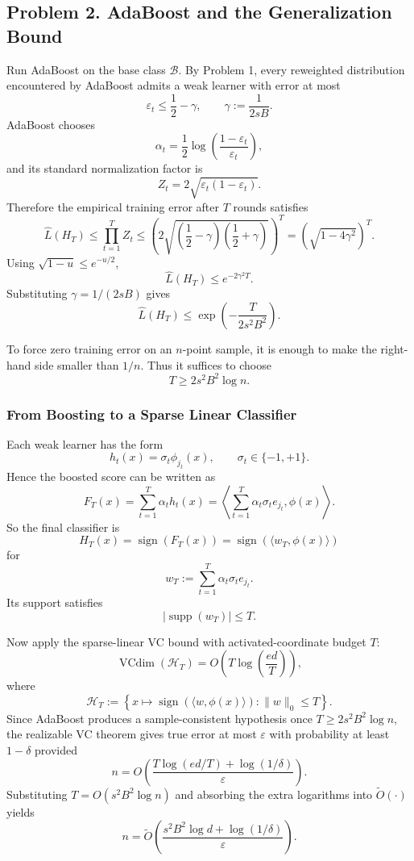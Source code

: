 \documentclass{article}
\DeclareMathOperator{\sign}{sign}
\DeclareMathOperator{\supp}{supp}
\DeclareMathOperator{\VC}{VCdim}
\newcommand{\cB}{\mathcal{B}}
\newcommand{\cH}{\mathcal{H}}
\begin{document}
\subsection{Problem 2. AdaBoost and the Generalization Bound}

Run AdaBoost on the base class $\cB$. By Problem 1, every reweighted distribution encountered by AdaBoost admits a weak learner with error at most
$$
\varepsilon_t \le \frac12 - \gamma,
\qquad
\gamma := \frac{1}{2sB}.
$$
AdaBoost chooses
$$
\alpha_t = \frac12 \log\!\left(\frac{1-\varepsilon_t}{\varepsilon_t}\right),
$$
and its standard normalization factor is
$$
Z_t = 2\sqrt{\varepsilon_t(1-\varepsilon_t)}.
$$
Therefore the empirical training error after $T$ rounds satisfies
$$
\widehat{L}(H_T)
\le
\prod_{t=1}^T Z_t
\le
\left(2\sqrt{\left(\frac12-\gamma\right)\left(\frac12+\gamma\right)}\right)^T
=
\left(\sqrt{1-4\gamma^2}\right)^T.
$$
Using $\sqrt{1-u}\le e^{-u/2}$,
$$
\widehat{L}(H_T)
\le
e^{-2\gamma^2 T}.
$$
Substituting $\gamma=1/(2sB)$ gives
$$
\widehat{L}(H_T)
\le
\exp\!\left(-\frac{T}{2s^2B^2}\right).
$$

To force zero training error on an $n$-point sample, it is enough to make the right-hand side smaller than $1/n$. Thus it suffices to choose
$$
T \ge 2s^2B^2 \log n.
$$

\subsubsection{From Boosting to a Sparse Linear Classifier}

Each weak learner has the form
$$
h_t(x)=\sigma_t \phi_{j_t}(x),
\qquad
\sigma_t \in \{-1,+1\}.
$$
Hence the boosted score can be written as
$$
F_T(x)
=
\sum_{t=1}^T \alpha_t h_t(x)
=
\left\langle
\sum_{t=1}^T \alpha_t \sigma_t e_{j_t},
\phi(x)
\right\rangle.
$$
So the final classifier is
$$
H_T(x)=\sign(F_T(x))=\sign(\langle w_T,\phi(x)\rangle)
$$
for
$$
w_T := \sum_{t=1}^T \alpha_t \sigma_t e_{j_t}.
$$
Its support satisfies
$$
|\supp(w_T)| \le T.
$$

Now apply the sparse-linear VC bound with activated-coordinate budget $T$:
$$
\VC(\cH_T)
=
O\!\left(T\log\!\left(\frac{ed}{T}\right)\right),
$$
where
$$
\cH_T
:=
\left\{
x \mapsto \sign(\langle w,\phi(x)\rangle)
:
\|w\|_0 \le T
\right\}.
$$
Since AdaBoost produces a sample-consistent hypothesis once $T\ge 2s^2B^2\log n$, the realizable VC theorem gives true error at most $\varepsilon$ with probability at least $1-\delta$ provided
$$
n
=
O\!\left(
\frac{
T\log(ed/T)+\log(1/\delta)
}{
\varepsilon
}
\right).
$$
Substituting $T=O(s^2B^2\log n)$ and absorbing the extra logarithms into $\widetilde{O}(\cdot)$ yields
$$
n
=
\widetilde{O}\!\left(
\frac{
s^2B^2\log d+\log(1/\delta)
}{
\varepsilon
}
\right).
$$
\end{document}
